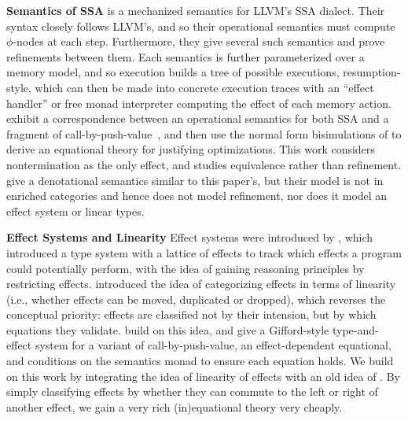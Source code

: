 \documentclass[acmsmall,screen,review]{acmart}
\begin{document}
\noindent \textbf{Semantics of SSA} \citet{vellvm-12} is a mechanized semantics for LLVM's SSA dialect.
Their syntax closely follows LLVM's, and so their operational semantics must compute
$\phi$-nodes at each step. Furthermore, they give several such semantics and
prove refinements between them. Each semantics is further parameterized
over a memory model, and so execution builds a tree of possible executions, resumption-style,
which can then be made into concrete execution traces with an ``effect handler'' or
free monad interpreter computing the effect of each memory action. 
\citet{garbuzov-structural-cfg-2018} exhibit a correspondence between
an operational semantics for both SSA and a fragment of
call-by-push-value~\cite{cbpv}, and then use the normal form
bisimulations of \citet{lassen-bisim} to derive an equational theory
for justifying optimizations.  This work considers nontermination as
the only effect, and studies equivalence rather than refinement.
\citet{ghalayini-24-ssa-densem-arxiv} give a denotational semantics
similar to this paper's, but their model is not in enriched categories and
hence does not model refinement, nor does it model an effect system or
linear types. 

\noindent \textbf{Effect Systems and Linearity} Effect systems were introduced by \citet{gifford86},
which introduced a type system with a lattice of effects to track which effects a program could
potentially perform, with the idea of gaining reasoning principles by restricting effects.
\citet{fuhrmann-direct-1999} introduced the idea of categorizing effects in terms of linearity
(i.e., whether effects can be moved, duplicated or dropped), which reverses the conceptual priority:
effects are classified not by their intension, but by which equations they validate.
\citet{kammar-effect-12} build on this idea, and give a Gifford-style type-and-effect system for a
variant of call-by-push-value, an effect-dependent equational, and conditions on the semantics monad
to ensure each equation holds.
%
%
We build on this work by integrating the idea of linearity of effects with an old idea of
\citet{lipton-mover-75}. By simply classifying effects by whether they can commute to the left or
right of another effect, we gain a very rich (in)equational theory very cheaply. 
\end{document}
